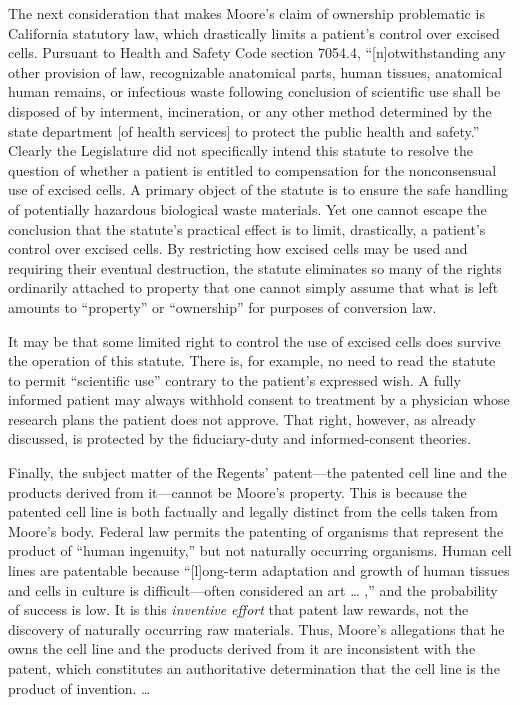 The next consideration that makes Moore's claim of ownership problematic is
California statutory law, which drastically limits a patient's control over
excised cells. Pursuant to Health and Safety Code section 7054.4,
``[n]otwithstanding any other provision of law, recognizable anatomical parts,
human tissues, anatomical human remains, or infectious waste following
conclusion of scientific use shall be disposed of by interment, incineration,
or any other method determined by the state department [of health services] to
protect the public health and safety.'' Clearly the Legislature did not specifically intend this
statute to resolve the question of whether a patient is entitled to
compensation for the nonconsensual use of excised cells. A primary object of
the statute is to ensure the safe handling of potentially hazardous biological
waste materials. Yet one cannot escape the conclusion that the statute's
practical effect is to limit, drastically, a patient's control over excised
cells. By restricting how excised cells may be  used and requiring their
eventual destruction, the statute eliminates so many of the rights ordinarily
attached to property that one cannot simply assume that what is left amounts to
``property'' or ``ownership'' for purposes of conversion law.

It may be that some limited right to control the use of excised cells does
survive the operation of this statute. There is, for example, no need to read
the statute to permit ``scientific use'' contrary to the patient's expressed
wish. A fully informed patient may always withhold consent to treatment by a
physician whose research plans the patient does not approve. That right,
however, as already discussed, is protected by the fiduciary-duty and
informed-consent theories.

Finally, the subject matter of the Regents' patent---the patented cell line and
the products derived from it---cannot be Moore's property. This is because the
patented cell line is both factually and legally distinct from the cells taken
from Moore's body. Federal law permits the patenting of organisms  that
represent the product of ``human ingenuity,'' but not naturally occurring
organisms. Human cell lines are patentable because ``[l]ong-term adaptation and
growth of human tissues and cells in culture is difficult---often considered
an art  {\dots} ,'' and the probability of success is low. It is this
\textit{inventive effort} that patent law rewards, not the discovery of
naturally occurring raw materials. Thus, Moore's allegations that he owns the
cell line and the products derived from it are inconsistent with the patent,
which constitutes an authoritative determination that the cell line is the
product of invention. {\dots}

